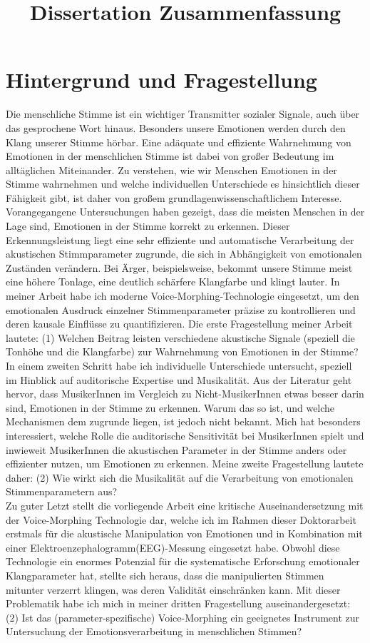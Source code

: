 \documentclass[11pt,a4paper,sans]{moderncv} %
\title{Dissertation Zusammenfassung}
\begin{document}
\makecvtitle

\section{Hintergrund und Fragestellung}
Die menschliche Stimme ist ein wichtiger Transmitter sozialer Signale, auch über das gesprochene Wort hinaus. Besonders unsere Emotionen werden durch den Klang unserer Stimme hörbar. Eine adäquate und effiziente Wahrnehmung von Emotionen in der menschlichen Stimme ist dabei von großer Bedeutung im alltäglichen Miteinander. Zu verstehen, wie wir Menschen Emotionen in der Stimme wahrnehmen und welche individuellen Unterschiede es hinsichtlich dieser Fähigkeit gibt, ist daher von großem grundlagenwissenschaftlichem Interesse. \\
Vorangegangene Untersuchungen haben gezeigt, dass die meisten Menschen in der Lage sind, Emotionen in der Stimme korrekt zu erkennen. Dieser Erkennungsleistung liegt eine sehr effiziente und automatische Verarbeitung der akustischen Stimmparameter zugrunde, die sich in Abhängigkeit von emotionalen Zuständen verändern. Bei Ärger, beispielsweise, bekommt unsere Stimme meist eine höhere Tonlage, eine deutlich schärfere Klangfarbe und klingt lauter. In meiner Arbeit habe ich moderne Voice-Morphing-Technologie eingesetzt, um den emotionalen Ausdruck einzelner Stimmenparameter präzise zu kontrollieren und deren kausale Einflüsse zu quantifizieren. Die erste Fragestellung meiner Arbeit lautete: (1) Welchen Beitrag leisten verschiedene akustische Signale (speziell die Tonhöhe und die Klangfarbe) zur Wahrnehmung von Emotionen in der Stimme? \\
In einem zweiten Schritt habe ich individuelle Unterschiede untersucht, speziell im Hinblick auf auditorische Expertise und Musikalität. Aus der Literatur geht hervor, dass MusikerInnen im Vergleich zu Nicht-MusikerInnen etwas besser darin sind, Emotionen in der Stimme zu erkennen. Warum das so ist, und welche Mechanismen dem zugrunde liegen, ist jedoch nicht bekannt. Mich hat besonders interessiert, welche Rolle die auditorische Sensitivität bei MusikerInnen spielt und inwieweit MusikerInnen die akustischen Parameter in der Stimme anders oder effizienter nutzen, um Emotionen zu erkennen. Meine zweite Fragestellung lautete daher: (2) Wie wirkt sich die Musikalität auf die Verarbeitung von emotionalen Stimmenparametern aus? \\
Zu guter Letzt stellt die vorliegende Arbeit eine kritische Auseinandersetzung mit der Voice-Morphing Technologie dar, welche ich im Rahmen dieser Doktorarbeit erstmals für die akustische Manipulation von Emotionen und in Kombination mit einer Elektroenzephalogramm(EEG)-Messung eingesetzt habe. Obwohl diese Technologie ein enormes Potenzial für die systematische Erforschung emotionaler Klangparameter hat, stellte sich heraus, dass die manipulierten Stimmen mitunter verzerrt klingen, was deren Validität einschränken kann. Mit dieser Problematik habe ich mich in meiner dritten Fragestellung auseinandergesetzt: (2) Ist das (parameter-spezifische) Voice-Morphing ein geeignetes Instrument zur Untersuchung der Emotionsverarbeitung in menschlichen Stimmen?
\end{document}
